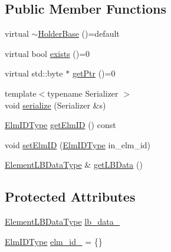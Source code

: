 \subsection*{Public Member Functions}
\begin{DoxyCompactItemize}
\item 
virtual \hyperlink{structvt_1_1objgroup_1_1holder_1_1_holder_base_a9388d2780a5ffa01677c3c535d42fbfa}{$\sim$\+Holder\+Base} ()=default
\item 
virtual bool \hyperlink{structvt_1_1objgroup_1_1holder_1_1_holder_base_afeebbe358baf0b2bfea57f52807be564}{exists} ()=0
\item 
virtual std\+::byte $\ast$ \hyperlink{structvt_1_1objgroup_1_1holder_1_1_holder_base_a9a15090cce1921fe9116a93b11b47be2}{get\+Ptr} ()=0
\item 
{\footnotesize template$<$typename Serializer $>$ }\\void \hyperlink{structvt_1_1objgroup_1_1holder_1_1_holder_base_a0d01f16a16316fab236b8753e7530efb}{serialize} (Serializer \&s)
\item 
\hyperlink{structvt_1_1objgroup_1_1holder_1_1_holder_base_a89c0ce1f23237ab00aee86d4d339bc50}{Elm\+I\+D\+Type} \hyperlink{structvt_1_1objgroup_1_1holder_1_1_holder_base_a36206831fe26ea16bd7bd3079bc45a8d}{get\+Elm\+ID} () const
\item 
void \hyperlink{structvt_1_1objgroup_1_1holder_1_1_holder_base_ac7bcdff4841dc78d23e7d96f7a383415}{set\+Elm\+ID} (\hyperlink{structvt_1_1objgroup_1_1holder_1_1_holder_base_a89c0ce1f23237ab00aee86d4d339bc50}{Elm\+I\+D\+Type} in\+\_\+elm\+\_\+id)
\item 
\hyperlink{structvt_1_1objgroup_1_1holder_1_1_holder_base_a53deb78d918d7281cf01a0f09e410411}{Element\+L\+B\+Data\+Type} \& \hyperlink{structvt_1_1objgroup_1_1holder_1_1_holder_base_aa4ebca4b40c0c1904650ea6a64342732}{get\+L\+B\+Data} ()
\end{DoxyCompactItemize}
\subsection*{Protected Attributes}
\begin{DoxyCompactItemize}
\item 
\hyperlink{structvt_1_1objgroup_1_1holder_1_1_holder_base_a53deb78d918d7281cf01a0f09e410411}{Element\+L\+B\+Data\+Type} \hyperlink{structvt_1_1objgroup_1_1holder_1_1_holder_base_a387f07d8e738b627a97ace582aa51430}{lb\+\_\+data\+\_\+}
\item 
\hyperlink{structvt_1_1objgroup_1_1holder_1_1_holder_base_a89c0ce1f23237ab00aee86d4d339bc50}{Elm\+I\+D\+Type} \hyperlink{structvt_1_1objgroup_1_1holder_1_1_holder_base_a0302cbe111e4bfa8cc8cd1fc47b39b27}{elm\+\_\+id\+\_\+} = \{\}
\end{DoxyCompactItemize}


